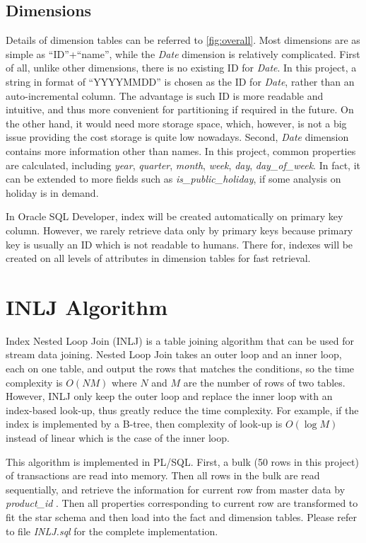\documentclass[
  a4paper,
]{article}
\begin{document}
\hypertarget{dimensions}{%
\subsection{Dimensions}\label{dimensions}}

Details of dimension tables can be referred to \cref{fig:overall}. Most
dimensions are as simple as ``ID''+``name'', while the \emph{Date}
dimension is relatively complicated. First of all, unlike other
dimensions, there is no existing ID for \emph{Date}. In this project, a
string in format of ``YYYYMMDD'' is chosen as the ID for \emph{Date},
rather than an auto-incremental column. The advantage is such ID is more
readable and intuitive, and thus more convenient for partitioning if
required in the future. On the other hand, it would need more storage
space, which, however, is not a big issue providing the cost storage is
quite low nowadays. Second, \emph{Date} dimension contains more
information other than names. In this project, common properties are
calculated, including \emph{year}, \emph{quarter}, \emph{month},
\emph{week}, \emph{day}, \emph{day\_of\_week}. In fact, it can be
extended to more fields such as \emph{is\_public\_holiday}, if some
analysis on holiday is in demand.

In Oracle SQL Developer, index will be created automatically on primary
key column. However, we rarely retrieve data only by primary keys
because primary key is usually an ID which is not readable to humans.
There for, indexes will be created on all levels of attributes in
dimension tables for fast retrieval.

\hypertarget{inlj-algorithm}{%
\section{INLJ Algorithm}\label{inlj-algorithm}}

Index Nested Loop Join (INLJ) is a table joining algorithm that can be
used for stream data joining. Nested Loop Join takes an outer loop and
an inner loop, each on one table, and output the rows that matches the
conditions, so the time complexity is \(O(N M)\) where \(N\) and \(M\)
are the number of rows of two tables. However, INLJ only keep the outer
loop and replace the inner loop with an index-based look-up, thus
greatly reduce the time complexity. For example, if the index is
implemented by a B-tree, then complexity of look-up is \(O(\log M)\)
instead of linear which is the case of the inner loop.

This algorithm is implemented in PL/SQL. First, a bulk (50 rows in this
project) of transactions are read into memory. Then all rows in the bulk
are read sequentially, and retrieve the information for current row from
master data by \emph{product\_id} . Then all properties corresponding to
current row are transformed to fit the star schema and then load into
the fact and dimension tables. Please refer to file \emph{INLJ.sql} for
the complete implementation.
\end{document}
